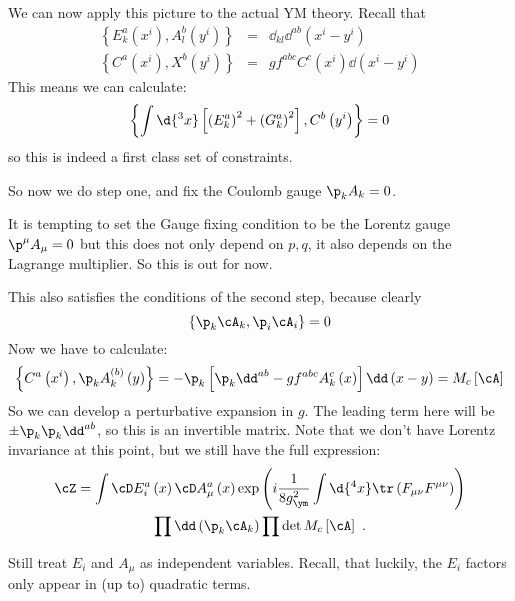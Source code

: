 \documentclass{booc}
\begin{document}
We can now apply this picture to the actual YM theory. Recall that
\begin{eqnarray}
\left\{ E_k^a\left( x^i \right) , A_l^b\left( y^i \right) \right\} &=& 
\dd_{kl} \dd^{ab} \left( x^i - y^i \right)
\\
\left\{ C^a\left( x^i \right) , X^b\left( y^i \right) \right\} &=& 
g f^{abc} C^c\left( x^i \right) \dd\left( x^i - y^i \right)
\end{eqnarray}
This means we can calculate:
\begin{equation}
\left\{ \int \d{^3 x}\left[ 
\left( E_k^a \right)^2 + 
\left( G_k^a \right)^2
\right] , C^b\left( y^i \right) \right\} = 0
\end{equation}
so this is indeed a first class set of constraints. 

So now we do step one, and fix the Coulomb gauge $\p_k A_k = 0$.
\begin{wrn}
It is tempting to set the Gauge fixing condition to be the Lorentz gauge
$\p^\mu A_\mu = 0$ but this  does not only depend on $p,q$, it also depends on the Lagrange
multiplier. So this is out for now.
\end{wrn}
This also satisfies the conditions of the second step, because clearly
\begin{equation}
\left\{ \p_k \cA_k , \p_i \cA_i \right\} = 0
\end{equation}
Now we have to calculate:
\begin{equation}
\left\{ C^a\left( x^i \right) , \p_k A_k^{\left( b \right)}\left( y \right) \right\} = 
-\p_k \left[ 
\p_k \dd^{ab} - g f^{abc} A_k^c\left( x \right)
\right]\dd\left( x - y \right)
= M_c\left[ \cA \right]
\end{equation}
So we can develop a perturbative expansion in $g$. 
The leading term here will be $\pm\p_k \p_k \dd^{ab}$, so
this is an invertible matrix.
Note that we don't have Lorentz invariance at this point, but we still have the full
expression:
\begin{multline}
\cZ = \int
\cD E_i^a\left( x \right) \cD A_\mu^a\left( x \right)
\exp\left( 
i \frac{1}{8 g_{\ym}^2}\int \d{^4 x} \tr\left( F_{\mu\nu} F^{\mu\nu} \right)
\right)
\\
\prod \dd\left( \p_k \cA_k \right)\prod\det M_c\left[ \cA \right]
\ .
\end{multline}

\begin{wrn}
Still treat $E_i$ and $A_\mu$ as independent variables.
Recall, that luckily, the $E_i$ factors only appear 
in (up to) quadratic terms.
\end{wrn}
\end{document}
